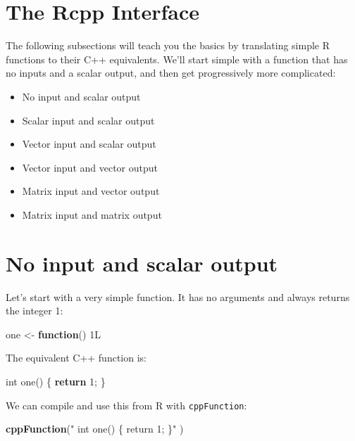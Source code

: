 \documentclass[
]{krantz}
\makeatletter
\newenvironment{Shaded}{\begin{snugshade}}{\end{snugshade}}
\newcommand{\ControlFlowTok}[1]{\textcolor[rgb]{0.27,0.27,0.27}{\textbf{#1}}}
\newcommand{\DataTypeTok}[1]{\textcolor[rgb]{0.27,0.27,0.27}{#1}}
\newcommand{\DecValTok}[1]{\textcolor[rgb]{0.06,0.06,0.06}{#1}}
\newcommand{\KeywordTok}[1]{\textcolor[rgb]{0.27,0.27,0.27}{\textbf{#1}}}
\newcommand{\NormalTok}[1]{#1}
\newcommand{\StringTok}[1]{\textcolor[rgb]{0.5,0.5,0.5}{#1}}
\providecommand{\tightlist}{%
  \setlength{\itemsep}{0pt}\setlength{\parskip}{0pt}}
\newenvironment{kframe}{%
\medskip{}
\setlength{\fboxsep}{.8em}
 \def\at@end@of@kframe{}%
 \ifinner\ifhmode%
  \def\at@end@of@kframe{\end{minipage}}%
  \begin{minipage}{\columnwidth}%
 \fi\fi%
 \def\FrameCommand##1{\hskip\@totalleftmargin \hskip-\fboxsep
 \colorbox{shadecolor}{##1}\hskip-\fboxsep
     \hskip-\linewidth \hskip-\@totalleftmargin \hskip\columnwidth}%
 \MakeFramed {\advance\hsize-\width
   \@totalleftmargin\z@ \linewidth\hsize
   \@setminipage}}%
 {\par\unskip\endMakeFramed%
 \at@end@of@kframe}
\renewenvironment{Shaded}{\begin{kframe}}{\end{kframe}}
\makeatother
\begin{document}
\hypertarget{the-rcpp-interface}{%
\section{The Rcpp Interface}\label{the-rcpp-interface}}

The following subsections will teach you the basics by translating simple R functions to their C++ equivalents. We'll start simple with a function that has no inputs and a scalar output, and then get progressively more complicated:

\begin{itemize}
\tightlist
\item
  No input and scalar output
\item
  Scalar input and scalar output
\item
  Vector input and scalar output
\item
  Vector input and vector output
\item
  Matrix input and vector output
\item
  Matrix input and matrix output
\end{itemize}

\hypertarget{no-input-and-scalar-output}{%
\section{No input and scalar output}\label{no-input-and-scalar-output}}

Let's start with a very simple function. It has no arguments and always returns the integer 1:

\begin{Shaded}
\begin{Highlighting}[]
\NormalTok{one \textless{}{-}}\StringTok{ }\ControlFlowTok{function}\NormalTok{() 1L}
\end{Highlighting}
\end{Shaded}

The equivalent C++ function is:

\begin{Shaded}
\begin{Highlighting}[]
\DataTypeTok{int}\NormalTok{ one() \{}
  \ControlFlowTok{return} \DecValTok{1}\NormalTok{;}
\NormalTok{\}}
\end{Highlighting}
\end{Shaded}

We can compile and use this from R with \texttt{cppFunction}:

\begin{Shaded}
\begin{Highlighting}[]
\KeywordTok{cppFunction}\NormalTok{(}\StringTok{"}
\StringTok{  int one() \{}
\StringTok{    return 1;}
\StringTok{  \}"}
\NormalTok{)}
\end{Highlighting}
\end{Shaded}
\end{document}
